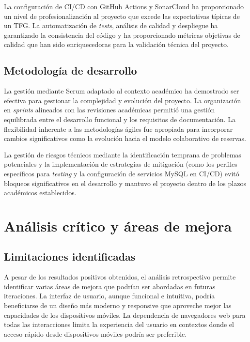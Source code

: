 La configuración de CI/CD con GitHub Actions y SonarCloud ha proporcionado un nivel de profesionalización al proyecto que excede las expectativas típicas de un TFG. La automatización de \emph{tests}, análisis de calidad y despliegue ha garantizado la consistencia del código y ha proporcionado métricas objetivas de calidad que han sido enriquecedoras para la validación técnica del proyecto.

\subsection{Metodología de desarrollo}\label{metodologias-desarrollo}
La gestión mediante Scrum adaptado al contexto académico ha demostrado ser efectiva para gestionar la complejidad y evolución del proyecto. La organización en \emph{sprints} alineados con las revisiones académicas permitió una gestión equilibrada entre el desarrollo funcional y los requisitos de documentación. La flexibilidad inherente a las metodologías ágiles fue apropiada para incorporar cambios significativos como la evolución hacia el modelo colaborativo de reservas.

La gestión de riesgos técnicos mediante la identificación temprana de problemas potenciales y la implementación de estrategias de mitigación (como los perfiles específicos para \emph{testing} y la configuración de servicios MySQL en CI/CD) evitó bloqueos significativos en el desarrollo y mantuvo el proyecto dentro de los plazos académicos establecidos.

\section{Análisis crítico y áreas de mejora}\label{analisis-critico-areas-mejora}
\subsection{Limitaciones identificadas}\label{limitaciones-identificadas}
A pesar de los resultados positivos obtenidos, el análisis retrospectivo permite identificar varias áreas de mejora que podrían ser abordadas en futuras iteraciones. La interfaz de usuario, aunque funcional e intuitiva, podría beneficiarse de un diseño más moderno y responsive que aproveche mejor las capacidades de los dispositivos móviles. La dependencia de navegadores web para todas las interacciones limita la experiencia del usuario en contextos donde el acceso rápido desde dispositivos móviles podría ser preferible.


